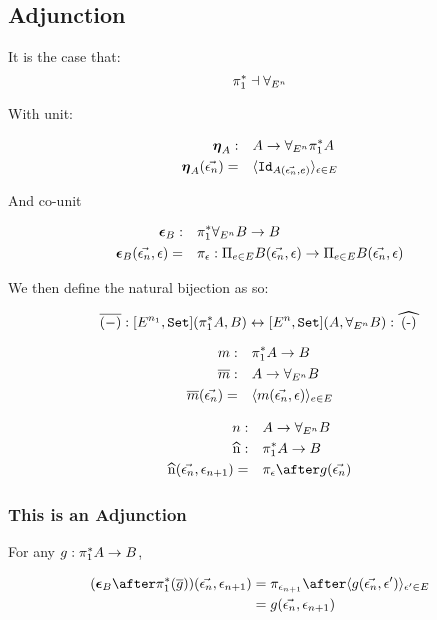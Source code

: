\documentclass{report}
\begin{document}
\subsection{Adjunction}
It is the case that:
$$\pi_1^* \dashv \forall_{E^n}$$

With unit:

\begin{align}
    \boldsymbol{\eta}_{A}:&\quad A \rightarrow \forall_{E^n}\pi_1^* A\\
    \boldsymbol{\eta}_{A}(\vec{\epsilon_n})=&\quad\langle \texttt{Id}_{A(\vec{\epsilon_n},e)}\rangle_{\epsilon\in E}
\end{align}


And co-unit


\begin{align}
    \boldsymbol{\epsilon}_{B} : &\quad \pi_1^*\forall_{E^n} B \rightarrow B\\
    \boldsymbol{\epsilon}_{B}(\vec{\epsilon_n}, \epsilon) =&\quad \pi_\epsilon : \Pi_{e\in E}B(\vec{\epsilon_n}, \epsilon)\rightarrow \Pi_{e\in E}B(\vec{\epsilon_n}, \epsilon)
\end{align}


We then define the natural bijection as so:

\begin{equation}
    \bar{(-)}: [E^{n_1}, \set](\pstar A, B) \leftrightarrow [E^n,\set] (A, \allEn B): \widehat{(-)}
\end{equation}

\begin{align}
    m:&\quad \pi_1^* A \rightarrow B\\
    \overline{m}:&\quad A\rightarrow \forall_{E^n} B\\
    \overline{m}(\vec{\epsilon_n}) =&\quad \langle m(\vec{\epsilon_n}, \epsilon)\rangle_{e\in E}
\end{align}


\begin{align}
    n:&\quad A \rightarrow \allEn B\\
    \widehat{n}:&\quad \pstar A\rightarrow B\\
    \widehat{n}(\env, \e_{n+1}) =&\quad\pi_\e\after g(\env)
\end{align}

\subsubsection{This is an Adjunction}
For any $g: \pi_1^* A \rightarrow B$,

\begin{align}
    (\counit{B}\after\pstar(\bar{g}))(\env, \e_{n+1}) & = \pi_{\e_{n+1}}\after\finpr{g(\env, \e')}{\e'\in E}\\
    &= g(\env, \e_{n+1})
\end{align}
\end{document}
